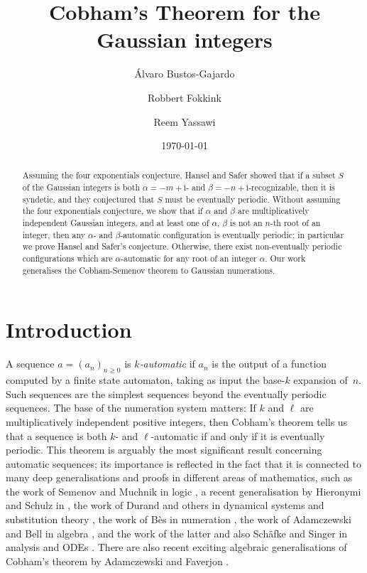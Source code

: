 \documentclass{amsart}
\title{Cobham's Theorem for the Gaussian integers}
\author{Álvaro Bustos-Gajardo}
\author{Robbert Fokkink}
\author{Reem Yassawi}
\date{\today}
\newcommand{\ii}{\mathrm{i}}
\newtheorem*{main theorem}{Theorem \ref{thm:main-gaussian}}
\theoremstyle{definition}
\begin{document}
\begin{abstract}
Assuming the four exponentials conjecture, Hansel and Safer showed that if a  subset $S$ of the Gaussian integers  is both $\alpha=-m+\ii $- and $\beta=-n+\ii $-recognizable, then it is syndetic, and they conjectured that $S$ must be eventually periodic. Without assuming the four exponentials conjecture, we show that if $\alpha$ and $\beta$ are multiplicatively independent Gaussian integers, and at least one of $\alpha$,  $\beta$ is not an $n$-th root of an integer, then any $\alpha$- and $\beta$-automatic  configuration  is eventually periodic; in particular we prove Hansel and Safer's conjecture.  Otherwise, there exist non-eventually periodic configurations which are $\alpha$-automatic  for any  root of an integer $\alpha$.    Our work generalises the  Cobham-Semenov theorem to Gaussian numerations. 
\end{abstract}

\maketitle

\section{Introduction}




A sequence $a = (a_n)_{n \geq 0}$ is  {\em $k$-automatic} if $a_n$ is the output
 of a function computed by a finite state automaton, taking as input 
 the base-$k$ expansion of~$n$. 
Such sequences are the simplest sequences beyond the eventually periodic sequences. The base of the numeration system matters:
If $k$ and $\ell$  are multiplicatively independent positive integers, then Cobham's theorem  \cite{Cobham-1969} tells us that  a sequence  is both $k$- and $\ell$-automatic if and only if it is eventually periodic. This theorem is arguably the most significant result 
concerning automatic sequences; its importance is reflected in the fact that it is connected to many deep generalisations and proofs in  different areas of mathematics, such as the work of Semenov and Muchnik in logic \cite{Semenov, Muchnik},  a recent generalisation by Hieronymi and Schulz in \cite{HS-2022 },  the work of Durand and others in dynamical systems and substitution theory \cite{Durand-2008 , Durand-2011, Coven-Dykstra-Lemasurier, Hosseini-Yassawi}, the work of Bès in numeration \cite{Bes-2000}, the work of Adamczewski and Bell in algebra \cite{Bell-2007, Adamczewski-Bell-2008}, and the work of the latter and also  Schäfke and Singer in analysis and ODEs \cite{Adamczewski-Bell-2011, SS-2019}. There are also recent exciting algebraic generalisations of Cobham's theorem by Adamczewski and Faverjon \cite{Adam-Fav-1, Adam-Fav-2}.
  
\end{document}
